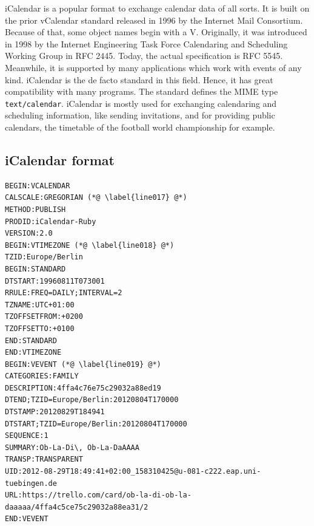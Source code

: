 iCalendar is a popular format to exchange calendar data of all sorts. It is built on the prior vCalendar standard released in 1996 by the Internet Mail Consortium. \cite{vcalendar} Because of that, some object names begin with a V. Originally, it was introduced in 1998 by the Internet Engineering Task Force Calendaring and Scheduling Working Group in RFC 2445. \cite{rfc:2445} Today, the actual specification is RFC 5545. \cite{rfc:5545} Meanwhile, it is supported by many applications which work with events of any kind. iCalendar is the de facto standard in this field. Hence, it has great compatibility with many programs. The standard defines the MIME type \texttt{text/calendar}. iCalendar is mostly used for exchanging calendaring and scheduling information, like sending invitations, and for providing public calendars, the timetable of the football world championship for example.

\subsection{iCalendar format}

\begin{lstlisting}[aboveskip=1\baselineskip, style=bash, caption=iCalendar example., label=listing024]
BEGIN:VCALENDAR
CALSCALE:GREGORIAN (*@ \label{line017} @*)
METHOD:PUBLISH
PRODID:iCalendar-Ruby
VERSION:2.0
BEGIN:VTIMEZONE (*@ \label{line018} @*)
TZID:Europe/Berlin
BEGIN:STANDARD
DTSTART:19960811T073001
RRULE:FREQ=DAILY;INTERVAL=2
TZNAME:UTC+01:00
TZOFFSETFROM:+0200
TZOFFSETTO:+0100
END:STANDARD
END:VTIMEZONE
BEGIN:VEVENT (*@ \label{line019} @*)
CATEGORIES:FAMILY
DESCRIPTION:4ffa4c76e75c29032a88ed19
DTEND;TZID=Europe/Berlin:20120804T170000
DTSTAMP:20120829T184941
DTSTART;TZID=Europe/Berlin:20120804T170000
SEQUENCE:1
SUMMARY:Ob-La-Di\, Ob-La-DaAAAA
TRANSP:TRANSPARENT
UID:2012-08-29T18:49:41+02:00_158310425@u-081-c222.eap.uni-tuebingen.de
URL:https://trello.com/card/ob-la-di-ob-la-daaaaa/4ffa4c5ce75c29032a88ea31/2
END:VEVENT
\end{lstlisting}

